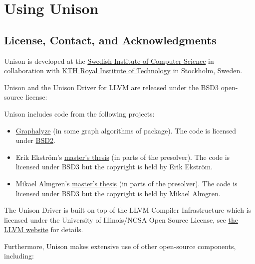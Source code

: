 \documentclass[11pt]{report}
\newenvironment{colorBox}[1]
 {\begin{tcolorbox}[
    breakable,
    colback=#1,
    colframe=white,
    boxrule=0pt
  ]}
 {\end{tcolorbox}}
\newenvironment{codeBox}
 {\begin{colorBox}{bgcolor4!20}}
 {\end{colorBox}}
\begin{document}
\part{Using Unison}
\label{part:using-unison}

\chapter{License, Contact, and Acknowledgments}%
\label{sec:license-contact-and-acknowledgments}

Unison is developed at the \href{https://www.sics.se/}{Swedish Institute of
  Computer Science} in collaboration with \href{https://www.kth.se/en}{KTH Royal
  Institute of Technology} in Stockholm, Sweden.

Unison and the Unison Driver for LLVM are released under the BSD3 open-source
license:

\begin{codeBox}
\end{codeBox}

Unison includes code from the following projects:

\begin{itemize}
\item \href{https://hackage.haskell.org/package/Graphalyze}{Graphalyze} (in some
  graph algorithms of  package).
  The code is licensed under
  \href{https://hackage.haskell.org/package/Graphalyze/src/LICENSE}{BSD2}.
\item Erik Ekström's
  \href{https://www.sics.se/\%7ercas/teaching/ErikEkstrom_2015.pdf}{master's
    thesis} (in parts of the presolver).
  The code is licensed under BSD3 but the copyright is held by Erik Ekström.

\item Mikael Almgren's
  \href{https://www.sics.se/\%7ercas/teaching/MikaelAlmgren_2015.pdf}{master's
    thesis} (in parts of the presolver).
  The code is licensed under BSD3 but the copyright is held by Mikael Almgren.
\end{itemize}

The Unison Driver is built on top of the LLVM Compiler Infrastructure which is
licensed under the University of Illinois/NCSA Open Source License, see
\href{http://llvm.org/}{the LLVM website} for details.

Furthermore, Unison makes extensive use of other open-source components,
including:
\end{document}

